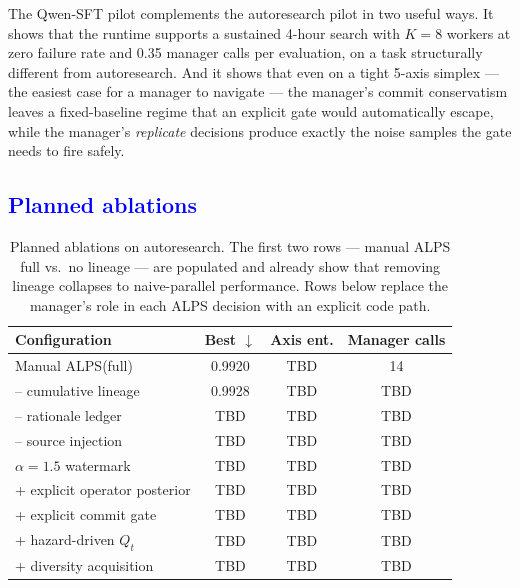\documentclass{article}
\newcommand{\alps}{ALPS\xspace}
\newcommand{\tbd}{\textcolor{red!70!black}{TBD}}
\newcommand{\lowerbetter}{$\downarrow$}
\newcommand{\added}[1]{\textcolor{blue}{#1}}
\newenvironment{addedblock}{\par\color{blue}}{\par}
\begin{document}
\begin{addedblock}
The Qwen-SFT pilot complements the autoresearch pilot in two useful ways. It shows that the runtime supports a sustained 4-hour search with $K=8$ workers at zero failure rate and 0.35 manager calls per evaluation, on a task structurally different from autoresearch. And it shows that even on a tight 5-axis simplex --- the easiest case for a manager to navigate --- the manager's commit conservatism leaves a fixed-baseline regime that an explicit gate would automatically escape, while the manager's \emph{replicate} decisions produce exactly the noise samples the gate needs to fire safely.
\end{addedblock}

\subsection{\added{Planned ablations}}  %

\begin{table}[t]
\centering
\small
\begin{tabular}{lccc}
\toprule
Configuration & Best \lowerbetter & Axis ent. & Manager calls \\
\midrule
Manual \alps (full)              & 0.9920 & \tbd & 14 \\
-- cumulative lineage             & 0.9928 & \tbd & \tbd \\
-- rationale ledger               & \tbd & \tbd & \tbd \\
-- source injection               & \tbd & \tbd & \tbd \\
$\alpha=1.5$ watermark            & \tbd & \tbd & \tbd \\
+ explicit operator posterior     & \tbd & \tbd & \tbd \\
+ explicit commit gate            & \tbd & \tbd & \tbd \\
+ hazard-driven $Q_t$             & \tbd & \tbd & \tbd \\
+ diversity acquisition           & \tbd & \tbd & \tbd \\
\bottomrule
\end{tabular}
\caption{Planned ablations on autoresearch. The first two rows --- manual \alps full vs.\ no lineage --- are populated and already show that removing lineage collapses to naive-parallel performance. Rows below replace the manager's role in each \alps decision with an explicit code path.}
\label{tab:ablation}
\end{table}
\end{document}
